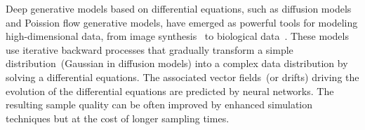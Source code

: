 Deep generative models based on differential equations, such as diffusion models and Poission flow generative models, have emerged as powerful tools for modeling high-dimensional data, from image synthesis~\cite{Song2020ScoreBasedGM, Ho2020DenoisingDP, Karras2022ElucidatingTD, Xu2022PoissonFG, Xu2023PFGMUT} to biological data~\cite{antipfgm, Watson2022BroadlyAA}. These models use iterative backward processes that gradually transform a simple distribution~(\eg Gaussian in diffusion models) into a complex data distribution by solving a differential equations. The associated vector fields~(or drifts) driving the evolution of the differential equations are predicted by neural networks. The resulting sample quality can be often improved by enhanced simulation techniques 
but at the cost of longer sampling times.



